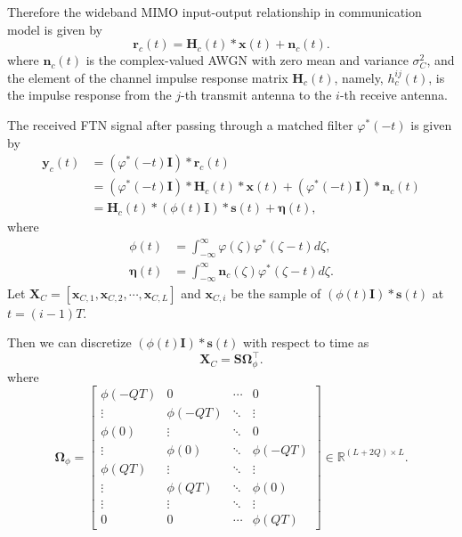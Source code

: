\documentclass[lettersize,journal]{IEEEtran}
\newcommand{\nocolor}[1]{{\color{black}#1}}
\begin{document}
Therefore the wideband MIMO input-output relationship in communication model is given by
\begin{equation}
    \mathbf{r}_c(t) = \mathbf{H}_c(t) * \mathbf{x}(t) + \mathbf{n}_c(t).
\end{equation}
where $\mathbf{n}_c(t)$ is the complex-valued AWGN with zero mean and variance $\sigma_C^2$, \nocolor{and the element} of the channel impulse response matrix $\mathbf{H}_c(t)$, \nocolor{namely, $h^{ij}_c(t)$}, is the impulse response from the $j$-th transmit antenna to the $i$-th receive antenna.

The received FTN signal after passing through a matched filter $\varphi^{*}(-t)$ is given by
\begin{equation}
\label{eq:c_model_1}
\begin{aligned}
    \mathbf{y}_c(t) &= (\varphi^*(-t)\mathbf{I}) * \mathbf{r}_c(t)  \\
    &= (\varphi^*(-t)\mathbf{I}) * \mathbf{H}_c(t) * \mathbf{x}(t) + (\varphi^*(-t)\mathbf{I}) * \mathbf{n}_c(t) \\
    &= \mathbf{H}_c(t) * (\phi(t)\mathbf{I}) * \mathbf{s}(t) + \bm{\eta}(t),
\end{aligned}
\end{equation}
where
\begin{equation}
\begin{aligned}
    \phi(t) &= \int_{-\infty}^{\infty}\varphi(\zeta)\varphi^{*}(\zeta-t)d\zeta, \\
    \bm{\eta}(t) &= \int_{-\infty}^{\infty}\mathbf{n}_c(\zeta)\varphi^{*}(\zeta-t)d\zeta.
\end{aligned}
\end{equation}
Let $\mathbf{X}_C=[\mathbf{x}_{C,1},\mathbf{x}_{C,2},\cdots,\mathbf{x}_{C,L}]$ and $\mathbf{x}_{C,i}$ be the sample of $(\phi(t)\mathbf{I}) * \mathbf{s}(t)$ at $t=(i-1)T$.

Then we can discretize $(\phi(t)\mathbf{I})*\mathbf{s}(t)$ with respect to time as 
\begin{equation}
\label{eq:discrete_xc}
    \mathbf{X}_C = \mathbf{S}\mathbf{\Omega}_{\phi}^{\top}.
\end{equation}
where 
\begin{equation}
\label{eq:define_omega_phi}
    \mathbf{\Omega}_{\phi} = 
    \begin{bmatrix}
        \phi(-QT) & 0 & \cdots & 0 \\
        \vdots & \phi(-QT) & \ddots & \vdots \\
        \phi(0) & \vdots & \ddots & 0 \\
        \vdots & \phi(0) & \ddots & \phi(-QT) \\
        \phi(QT) & \vdots & \ddots & \vdots \\
        \vdots & \phi(QT) & \ddots & \phi(0) \\
        \vdots & \vdots & \ddots & \vdots \\
        0 & 0 & \cdots & \phi(QT)
    \end{bmatrix}\in\mathbb{R}^{(L+2Q)\times L}.
\end{equation}
\end{document}
